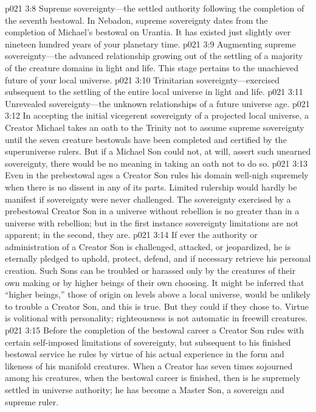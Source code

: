 \pc \vs p021 3:8 \bibnobreakspace Supreme sovereignty---the settled authority following the completion of the seventh bestowal. In Nebadon, supreme sovereignty dates from the completion of Michael’s bestowal on Urantia. It has existed just slightly over nineteen hundred years of your planetary time.
\pc \vs p021 3:9 \bibnobreakspace Augmenting supreme sovereignty---the advanced relationship growing out of the settling of a majority of the creature domains in light and life. This stage pertains to the unachieved future of your local universe.
\pc \vs p021 3:10 \bibnobreakspace Trinitarian sovereignty---exercised subsequent to the settling of the entire local universe in light and life.
\pc \vs p021 3:11 \bibnobreakspace Unrevealed sovereignty---the unknown relationships of a future universe age.
\pc \vs p021 3:12 In accepting the initial vicegerent sovereignty of a projected local universe, a Creator Michael takes an oath to the Trinity not to assume supreme sovereignty until the seven creature bestowals have been completed and certified by the superuniverse rulers. But if a Michael Son could not, at will, assert such unearned sovereignty, there would be no meaning in taking an oath not to do so.
\vs p021 3:13 Even in the prebestowal ages a Creator Son rules his domain well\hyp{}nigh supremely when there is no dissent in any of its parts. Limited rulership would hardly be manifest if sovereignty were never challenged. The sovereignty exercised by a prebestowal Creator Son in a universe without rebellion is no greater than in a universe with rebellion; but in the first instance sovereignty limitations are not apparent; in the second, they are.
\vs p021 3:14 If ever the authority or administration of a Creator Son is challenged, attacked, or jeopardized, he is eternally pledged to uphold, protect, defend, and if necessary retrieve his personal creation. Such Sons can be troubled or harassed only by the creatures of their own making or by higher beings of their own choosing. It might be inferred that “higher beings,” those of origin on levels above a local universe, would be unlikely to trouble a Creator Son, and this is true. But they could if they chose to. Virtue is volitional with personality; righteousness is not automatic in freewill creatures.
\vs p021 3:15 Before the completion of the bestowal career a Creator Son rules with certain self\hyp{}imposed limitations of sovereignty, but subsequent to his finished bestowal service he rules by virtue of his actual experience in the form and likeness of his manifold creatures. When a Creator has seven times sojourned among his creatures, when the bestowal career is finished, then is he supremely settled in universe authority; he has become a Master Son, a sovereign and supreme ruler.
